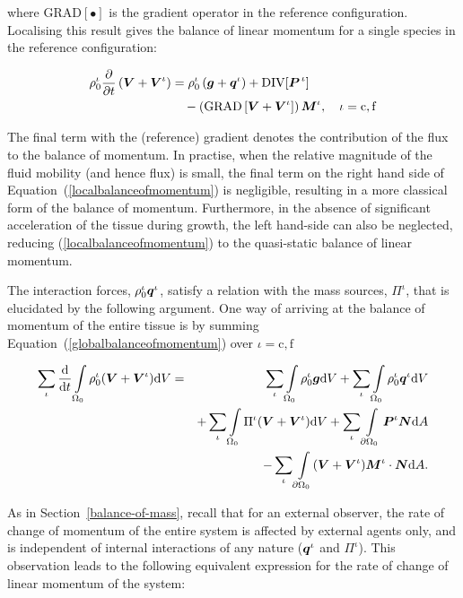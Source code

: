 \noindent where $\mathrm{{GRAD}[\bullet]}$ is the gradient
operator in the reference configuration. Localising this result gives
the balance of linear momentum for a single species in the reference
configuration:

\begin{equation}
\begin{split}
\rho_0^\iota\frac{\partial}{\partial t}\left(\mbox{\boldmath$ V$}+\mbox{\boldmath$ V$}^\iota\right) &
=\rho^\iota_0\left(\mbox{\boldmath$ g$}+\mbox{\boldmath$ q$}^\iota\right) +
\mathrm{DIV}[\mbox{\boldmath$ P$}^{\,\iota}]\\ 
& \quad -\left(\mathrm{GRAD}\left[\mbox{\boldmath$ V$}+
  \mbox{\boldmath$ V$}^\iota\right]\right)\mbox{\boldmath$ M$}^\iota, \quad \iota = \mathrm{c,f}
\label{localbalanceofmomentum}
\end{split}
\end{equation} 

The final term with the (reference) gradient denotes the contribution
of the flux to the balance of momentum. In practise, when the relative
magnitude of the fluid mobility (and hence flux) is small, the
final term on the right hand side of
Equation~(\ref{localbalanceofmomentum}) is negligible, resulting in a
more classical form of the balance of momentum. Furthermore, in the
absence of significant acceleration of the tissue during growth, the
left hand-side can also be neglected, reducing
(\ref{localbalanceofmomentum}) to the quasi-static balance of linear
momentum.

The interaction forces, $\rho_0^\iota\mbox{\boldmath$ q$}^\iota$, satisfy a
relation with the mass sources, $\Pi^\iota$, that is elucidated by
the following argument. One way of arriving at the  balance of
momentum of the entire tissue is by summing
Equation~(\ref{globalbalanceofmomentum}) over $\iota = \mathrm{c,f}$

\begin{eqnarray}
\sum\limits_{\iota}\frac{\mathrm{d}}{\mathrm{d}t}
\int\limits_{\Omega_0} \rho_0^\iota(\mbox{\boldmath$ V$}+\mbox{\boldmath$ V$}^\iota) \mathrm{d}V &=&
\sum\limits_{\iota}\int\limits_{\Omega_0} \rho^\iota_0\mbox{\boldmath$ g$}
\mathrm{d}V + \sum\limits_{\iota}\int\limits_{\Omega_0}
\rho^\iota_0\mbox{\boldmath$ q$}^\iota \mathrm{d}V\nonumber\\& & +
\sum\limits_{\iota}\int\limits_{\Omega_0} \Pi^\iota(\mbox{\boldmath$ V$}+\mbox{\boldmath$ V$}^\iota)
\mathrm{d}V + \sum\limits_{\iota} \int\limits_{\partial
\Omega_0}\mbox{\boldmath$ P$}^\iota\mbox{\boldmath$ N$} \mathrm{d}A\nonumber\\
& & - \sum\limits_{\iota}\int\limits_{\partial
\Omega_0}(\mbox{\boldmath$ V$}+\mbox{\boldmath$ V$}^\iota)\mbox{\boldmath$ M$}^\iota\cdot\mbox{\boldmath$ N$} \mathrm{d}A.
\label{momentumsummation}
\end{eqnarray}

As in Section~\ref{balance-of-mass}, recall that for an external
observer, the rate of change of momentum of the entire system is
affected by external agents only, and is independent of internal
interactions of any nature ($\mbox{\boldmath$ q$}^\iota$ and $\Pi^\iota$). This
observation leads to the following equivalent expression for the rate
of change of linear momentum of the system:

